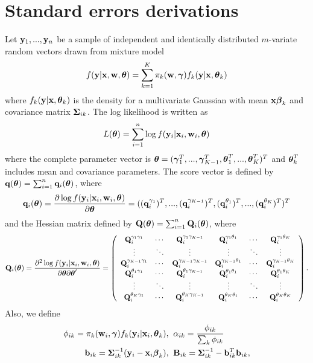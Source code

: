 \chapter{Standard errors derivations}\label{append:1}

Let $\mathbf y_{1},...,\mathbf y_{n}$ be a sample of independent and identically distributed  $m$-variate random vectors drawn from mixture model
$$f(\mathbf y|\mathbf x, \mathbf w, \boldsymbol\theta) = \sum^{K}_{k=1}\pi_{k}(\mathbf w, \boldsymbol\gamma)f_{k}(\mathbf y|\mathbf x, \boldsymbol \theta_{k})$$
where $f_{k}(\mathbf y|\mathbf x, \boldsymbol \theta_{k})$ is the density for a multivariate Gaussian with mean $\mathbf x\boldsymbol\beta_{k}$ and covariance matrix $\boldsymbol\Sigma_{ik}$. The log likelihood is written as
$$L(\boldsymbol\theta)=\sum^{n}_{i=1}\log f(\mathbf y_{i}|\mathbf x_{i},\mathbf w_{i},\boldsymbol\theta)$$
where the complete parameter vector is $\boldsymbol\theta=(\boldsymbol\gamma_{1}^{T},...,\boldsymbol\gamma_{K-1}^{T},\boldsymbol\theta^{T}_{1},...,\boldsymbol\theta^{T}_{K})^{T}$ and $\boldsymbol\theta_{k}^{T}$ includes mean and covariance parameters. The score vector is defined by $\mathbf q(\boldsymbol\theta)=\sum_{i=1}^{n}\mathbf q_{i}(\boldsymbol \theta)$, where
$$\mathbf q_{i}(\boldsymbol\theta)=\frac{\partial \log f(\mathbf y_{i}|\mathbf x_{i},\mathbf w_{i},\boldsymbol\theta)}{\partial \boldsymbol\theta}=((\mathbf q^{\gamma_{1}}_{i})^{T},...,(\mathbf q^{\gamma_{K-1}}_{i})^{T},(\mathbf q^{\theta_{1}}_{i})^{T},...,(\mathbf q^{\theta_{K}}_{i})^{T})^{T}$$
and the Hessian matrix defined by $\mathbf Q(\boldsymbol\theta)=\sum_{i=1}^{n}\mathbf Q_{i}(\boldsymbol\theta)$, where
$$ \mathbf Q_{i}(\boldsymbol\theta)=\frac{\partial^{2} \log f(\mathbf y_{i}|\mathbf x_{i},\mathbf w_{i},\boldsymbol\theta)}{\partial \boldsymbol\theta\partial \boldsymbol\theta'}=\left(\begin{array}{cccccc} \mathbf Q^{\gamma_{1}\gamma_{1}}_{i}&\cdots&\mathbf Q^{\gamma_{1}\gamma_{K-1}}_{i}&\mathbf Q^{\gamma_{1}\theta_{1}}_{i}&\cdots&\mathbf Q^{\gamma_{1}\theta_{K}}_{i}\\
\vdots&\ddots&\vdots&\vdots&\ddots&\vdots\\
\mathbf Q^{\gamma_{K-1}\gamma_{1}}_{i}&\cdots&\mathbf Q^{\gamma_{K-1}\gamma_{K-1}}_{i}&\mathbf Q^{\gamma_{K-1}\theta_{1}}_{i}&\cdots&\mathbf Q^{\gamma_{K-1}\theta_{K}}_{i}\\
\mathbf Q^{\theta_{1}\gamma_{1}}_{i}&\cdots&\mathbf Q^{\theta_{1}\gamma_{K-1}}_{i}&\mathbf Q^{\theta_{1}\theta_{1}}_{i}&\cdots&\mathbf Q^{\theta_{1}\theta_{K}}_{i}\\
\vdots&\ddots&\vdots&\vdots&\ddots&\vdots\\
\mathbf Q^{\theta_{K}\gamma_{1}}_{i}&\cdots&\mathbf Q^{\theta_{K}\gamma_{K-1}}_{i}&\mathbf Q^{\theta_{K}\theta_{1}}_{i}&\cdots&\mathbf Q^{\theta_{K}\theta_{K}}_{i}\\
\end{array} \right).$$
Also, we define
\begin{align}
\phi_{ik}=\pi_{k}(\mathbf w_{i},\boldsymbol\gamma)f_{k}(\mathbf y_{i}|\mathbf x_{i},\boldsymbol\theta_{k}),&\;\; \alpha_{ik}=\frac{\phi_{ik}}{\sum_{k}\phi_{ik}}\label{phi}\\
\mathbf b_{ik}=\boldsymbol\Sigma_{ik}^{-1}(\mathbf y_{i}-\mathbf x_{i}\boldsymbol\beta_{k}),&\;\; \mathbf B_{ik}=\boldsymbol\Sigma_{ik}^{-1}-\mathbf b^{T}_{ik}\mathbf b_{ik},\label{bs2}
\end{align}

